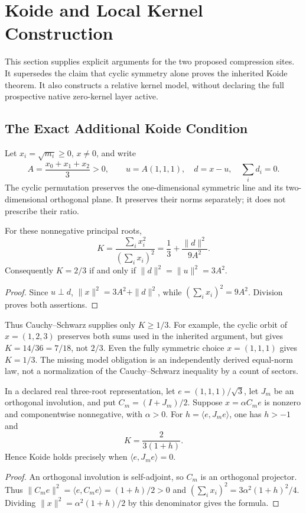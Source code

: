 \section{Koide and Local Kernel Construction}
\label{v480:koide-kernel}

This section supplies explicit arguments for the two proposed compression
sites. It supersedes the claim that cyclic symmetry alone proves the
inherited Koide theorem. It also constructs a relative kernel model,
without declaring the full prospective native zero-kernel layer active.

\subsection{The Exact Additional Koide Condition}
\label{v480:koide-condition}

Let $x_i=\sqrt{m_i}\geq0$, $x\ne0$, and write
\[
 A=\frac{x_0+x_1+x_2}{3}>0,\qquad
 u=A(1,1,1),\quad d=x-u,\quad \sum_i d_i=0.
\]
The cyclic permutation preserves the one-dimensional symmetric line
and its two-dimensional orthogonal plane. It preserves their norms
separately; it does not prescribe their ratio.

\begin{proposition}
\label{v480:koide-equal-norm}
For these nonnegative principal roots,
\[
 K=\frac{\sum_i x_i^2}{(\sum_i x_i)^2}
   =\frac13+\frac{\|d\|^2}{9A^2}.
\]
Consequently $K=2/3$ if and only if
$\|d\|^2=\|u\|^2=3A^2$.
\end{proposition}
\begin{proof}
Since $u\perp d$, $\|x\|^2=3A^2+\|d\|^2$, while
$(\sum_i x_i)^2=9A^2$. Division proves both assertions.
\end{proof}

Thus Cauchy--Schwarz supplies only $K\geq1/3$. For example,
the cyclic orbit of $x=(1,2,3)$ preserves both sums used in the
inherited argument, but gives $K=14/36=7/18$, not $2/3$.
Even the fully symmetric choice $x=(1,1,1)$ gives $K=1/3$.
The missing model obligation is an independently derived equal-norm
law, not a normalization of the Cauchy--Schwarz inequality by a
count of sectors.

\begin{proposition}
\label{v480:koide-hc-mixing}
In a declared real three-root representation, let
$e=(1,1,1)/\sqrt3$, let $J_m$ be an orthogonal involution, and put
$C_m=(I+J_m)/2$. Suppose $x=\alpha C_m e$ is nonzero and
componentwise nonnegative, with $\alpha>0$. For
$h=\langle e,J_m e\rangle$, one has $h>-1$ and
\[
 K=\frac{2}{3(1+h)}.
\]
Hence Koide holds precisely when $\langle e,J_m e\rangle=0$.
\end{proposition}
\begin{proof}
An orthogonal involution is self-adjoint, so $C_m$ is an
orthogonal projector. Thus
$\|C_m e\|^2=\langle e,C_m e\rangle=(1+h)/2>0$ and
$(\sum_i x_i)^2=3\alpha^2(1+h)^2/4$. Dividing
$\|x\|^2=\alpha^2(1+h)/2$ by this denominator gives the formula.
\end{proof}

